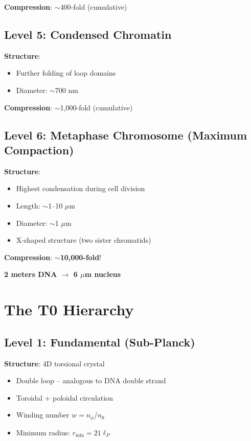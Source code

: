 	\textbf{Compression}: $\sim$400-fold (cumulative)
	
	\subsection{Level 5: Condensed Chromatin}
	
	\textbf{Structure}:
	\begin{itemize}
		\item Further folding of loop domains
		\item Diameter: $\sim$700 nm
	\end{itemize}
	
	\textbf{Compression}: $\sim$1,000-fold (cumulative)
	
	\subsection{Level 6: Metaphase Chromosome (Maximum Compaction)}
	
	\textbf{Structure}:
	\begin{itemize}
		\item Highest condensation during cell division
		\item Length: $\sim$1--10 $\mu$m
		\item Diameter: $\sim$1 $\mu$m
		\item X-shaped structure (two sister chromatids)
	\end{itemize}
	
	\textbf{Compression}: $\sim$\textbf{10,000-fold}!
	
	\begin{center}
		\textbf{2 meters DNA $\to$ 6 $\mu$m nucleus}
	\end{center}
	
	\section{The T0 Hierarchy}
	
	\subsection{Level 1: Fundamental (Sub-Planck)}
	
	\textbf{Structure}: 4D torsional crystal
	\begin{itemize}
		\item Double loop -- analogous to DNA double strand
		\item Toroidal + poloidal circulation
		\item Winding number $w = n_\phi / n_\theta$
		\item Minimum radius: $r_{\min} = 21\ell_P$
	\end{itemize}
	
